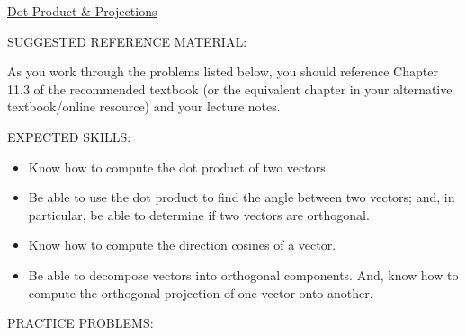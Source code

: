 \documentclass[12pt]{article}
\begin{document}
\begin{center}
\underline{\LARGE{Dot Product \& Projections}}
\end{center}

\bigskip

\noindent SUGGESTED REFERENCE MATERIAL:

\bigskip

\noindent As you work through the problems listed below, you should reference Chapter 11.3 of the recommended textbook (or the equivalent chapter in your alternative textbook/online resource) and your lecture notes.

\bigskip

\noindent EXPECTED SKILLS:

\begin{itemize}

\item Know how to compute the dot product of two vectors. 

\item Be able to use the dot product to find the angle between two vectors;  and, in particular, be able to determine if two vectors are orthogonal.

\item  Know how to compute the direction cosines of a vector. 

\item Be able to decompose vectors into orthogonal components. And, know how to compute the orthogonal projection of one vector onto another.

\end{itemize}

\noindent PRACTICE PROBLEMS:

\medskip
\end{document}
